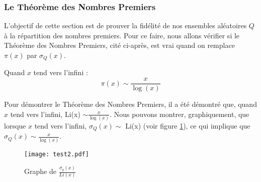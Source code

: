 \documentclass[../main.tex]{report}
\begin{document}
\subsubsection{Le Théorème des Nombres Premiers}

L'objectif de cette section est de prouver la fidélité de nos ensembles aléatoires $Q$ à la répartition des nombres premiers.
Pour ce faire, nous allons vérifier si le Théorème des Nombres Premiers, cité ci-après, est vrai quand on remplace $\pi(x)$ par $\sigma_{Q}(x)$. 

\begin{Thm}
\label{TNP}
	Quand $x$ tend vers l'infini : 
	\[ \pi(x) \sim \frac{x}{\log(x)}  \] 
\end{Thm}

Pour démontrer le Théorème des Nombres Premiers, il a été démontré que, quand $x$ tend vers l'infini, Li(x) $ \sim \frac{x}{\log(x)} $. Nous pouvons montrer, graphiquement, que lorsque $x$ tend vers l'infini, $ \sigma_{Q}(x) \sim $ Li(x)  (voir figure \ref{im:image3}), ce qui implique que $ \sigma_{Q}(x) \sim \frac{x}{\log(x)} $.

\begin{figure}[H]
 \centering
 \texttt{[image: test2.pdf]}
 \caption{Graphe de $\frac{\sigma_{q}(x)}{Li(x)}$}
 \label{im:image3}
 \end{figure}
\end{document}

